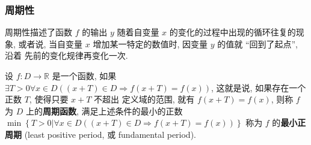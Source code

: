 \documentclass[10pt,UTF8]{book} %
\begin{document}
\subsubsection{周期性}

周期性描述了函数 $f$ 的输出 $y$ 随着自变量 $x$ 的变化的过程中出现的循环往复的现象,
或者说, 当自变量 $x$ 增加某一特定的数值时, 因变量 $y$ 的值就 “回到了起点”, 沿着
先前的变化规律再变化一次.

\begin{definition}[周期函数]
    设 $f: D \to \mathbb{R}$ 是一个函数, 如果
    $\exists T>0 \forall x \in D \left( (x+T) \in D \Longrightarrow
    f(x+T) = f(x) \right)$,
    这就是说, 如果{\kaishu 存在一个正数 $T$, 使得只要 $x+T$ 不超出
    定义域的范围, 就有 $f(x+T)=f(x)$}, 则称 $f$ 为 $D$ 上的\textbf{周期函数},
    满足上述条件的最小的正数 $\min \left\{ T>0 | \forall x \in D \left(
        (x+T) \in D \Longrightarrow f(x+T)=f(x)
    \right) \right\}$ 称为 $f$ 的\textbf{最小正周期} (least positive period,
    或 fundamental period).
\end{definition}
\end{document}
